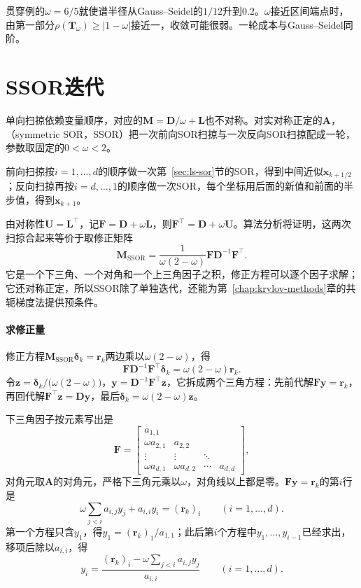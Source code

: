 贯穿例的$\omega=6/5$就使谱半径从Gauss--Seidel的$1/12$升到$0.2$。$\omega$接近区间端点时，由第一部分$\rho(\bm T_\omega)\geq|1-\omega|$接近一，收敛可能很弱。一轮成本与Gauss--Seidel同阶。

\section{SSOR迭代}
\label{sec:ls-ssor}

单向扫掠依赖变量顺序，对应的$\bm M=\bm D/\omega+\bm L$也不对称。对实对称正定的$\bm A$，（symmetric SOR，SSOR）把一次前向SOR扫掠与一次反向SOR扫掠配成一轮，参数取固定的$0<\omega<2$。

前向扫掠按$i=1,\ldots,d$的顺序做一次第~\ref{sec:ls-sor}节的SOR，得到中间近似$\bm x_{k+1/2}$；反向扫掠再按$i=d,\ldots,1$的顺序做一次SOR，每个坐标用后面的新值和前面的半步值，得到$\bm x_{k+1}$。

由对称性$\bm U=\bm L^\top$，记$\bm F=\bm D+\omega\bm L$，则$\bm F^\top=\bm D+\omega\bm U$。算法分析将证明，这两次扫掠合起来等价于取修正矩阵
\begin{equation}
 \bm M_{\mathrm{SSOR}}=\frac{1}{\omega(2-\omega)}\bm F\bm D^{-1}\bm F^\top .
 \label{eq:ls-ssor-correction-matrix}
\end{equation}
它是一个下三角、一个对角和一个上三角因子之积，修正方程可以逐个因子求解；它还对称正定，所以SSOR除了单独迭代，还能为第~\ref{chap:krylov-methods}章的共轭梯度法提供预条件。

\paragraph{求修正量}
修正方程$\bm M_{\mathrm{SSOR}}\bm\delta_k=\bm r_k$两边乘以$\omega(2-\omega)$，得
\[
 \bm F\bm D^{-1}\bm F^\top\bm\delta_k=\omega(2-\omega)\bm r_k .
\]
令$\bm z=\bm\delta_k/\bigl(\omega(2-\omega)\bigr)$，$\bm y=\bm D^{-1}\bm F^\top\bm z$，它拆成两个三角方程：先前代解$\bm F\bm y=\bm r_k$，再回代解$\bm F^\top\bm z=\bm D\bm y$，最后$\bm\delta_k=\omega(2-\omega)\bm z$。

下三角因子按元素写出是
\[
 \bm F=\begin{bmatrix}a_{1,1}&&&\\\omega a_{2,1}&a_{2,2}&&\\\vdots&\vdots&\ddots&\\\omega a_{d,1}&\omega a_{d,2}&\cdots&a_{d,d}\end{bmatrix},
\]
对角元取$\bm A$的对角元，严格下三角元乘以$\omega$，对角线以上都是零。$\bm F\bm y=\bm r_k$的第$i$行是
\[
 \omega\sum_{j<i}a_{i,j}y_j+a_{i,i}y_i=(\bm r_k)_i\qquad(i=1,\ldots,d).
\]
第一个方程只含$y_1$，得$y_1=(\bm r_k)_1/a_{1,1}$；此后第$i$个方程中$y_1,\ldots,y_{i-1}$已经求出，移项后除以$a_{i,i}$，得
\begin{equation}
 y_i=\frac{(\bm r_k)_i-\omega\sum_{j<i}a_{i,j}y_j}{a_{i,i}}\qquad(i=1,\ldots,d).
 \label{eq:ls-ssor-forward}
\end{equation}

